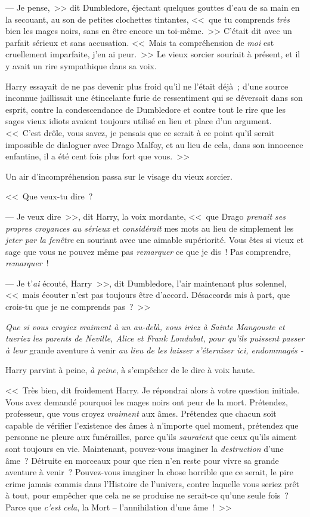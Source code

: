 --- Je pense,~>> dit Dumbledore, éjectant quelques gouttes d'eau de sa main en la secouant, au son de petites clochettes tintantes, <<~que tu comprends \emph{très} bien les mages noirs, sans en être encore un toi-même.~>> C'était dit avec un parfait sérieux et sans accusation. <<~Mais ta compréhension de \emph{moi} est cruellement imparfaite, j'en ai peur.~>> Le vieux sorcier souriait à présent, et il y avait un rire sympathique dans sa voix.

Harry essayait de ne pas devenir plus froid qu'il ne l'était déjà~; d'une source inconnue jaillissait une étincelante furie de ressentiment qui se déversait dans son esprit, contre la condescendance de Dumbledore et contre tout le rire que les sages vieux idiots avaient toujours utilisé en lieu et place d'un argument. <<~C'est drôle, vous savez, je pensais que ce serait à ce point qu'il serait impossible de dialoguer avec Drago Malfoy, et au lieu de cela, dans son innocence enfantine, il a été cent fois plus fort que vous.~>>

Un air d'incompréhension passa sur le visage du vieux sorcier.

<<~Que veux-tu dire~?

--- Je veux dire~>>, dit Harry, la voix mordante, <<~que Drago \emph{prenait ses propres croyances au sérieux} et \emph{considérait} mes mots au lieu de simplement les \emph{jeter par la fenêtre} en souriant avec une aimable supériorité. Vous êtes si vieux et sage que vous ne pouvez même pas \emph{remarquer} ce que je dis~! Pas comprendre, \emph{remarquer}~!

--- Je t'\emph{ai} écouté, Harry~>>, dit Dumbledore, l'air maintenant plus solennel, <<~mais écouter n'est pas toujours être d'accord. Désaccords mis à part, que crois-tu que je ne comprends pas~?~>>

\emph{Que si vous croyiez vraiment à un au-delà, vous iriez à Sainte Mangouste et tueriez les parents de Neville, Alice et Frank Londubat, pour qu'ils puissent passer à leur} grande aventure à venir \emph{au lieu de les laisser s'éterniser ici, endommagés -}

Harry parvint à peine, \emph{à peine}, à s'empêcher de le dire à voix haute.

<<~Très bien, dit froidement Harry. Je répondrai alors à votre question initiale. Vous avez demandé pourquoi les mages noirs ont peur de la mort. Prétendez, professeur, que vous croyez \emph{vraiment} aux âmes. Prétendez que chacun soit capable de vérifier l'existence des âmes à n'importe quel moment, prétendez que personne ne pleure aux funérailles, parce qu'ils \emph{sauraient} que ceux qu'ils aiment sont toujours en vie. Maintenant, pouvez-vous imaginer la \emph{destruction} d'une âme~? Détruite en morceaux pour que rien n'en reste pour vivre sa grande aventure à venir~? Pouvez-vous imaginer la chose horrible que ce serait, le pire crime jamais commis dans l'Histoire de l'univers, contre laquelle vous seriez prêt à tout, pour empêcher que cela ne se produise ne serait-ce qu'une seule fois~? Parce que \emph{c'est cela}, la Mort -- l'annihilation d'une âme~!~>>

